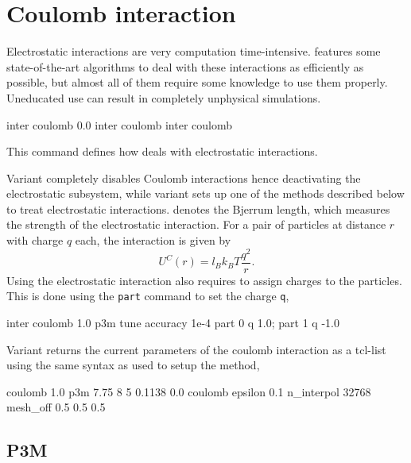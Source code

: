 \section{Coulomb interaction}
\label{sec:inter-electrostatics}

Electrostatic interactions are very computation time-intensive. \es{} features
some state-of-the-art algorithms to deal with these interactions as efficiently
as possible, but almost all of them require some knowledge to use them properly.
Uneducated use can result in completely unphysical simulations.

\begin{essyntax}
   inter coulomb 0.0
   inter coulomb  
   inter coulomb
\end{essyntax}

This command defines how \es deals with electrostatic interactions.

Variant  completely disables Coulomb interactions hence
deactivating the electrostatic subsystem, while variant 
sets up one of the methods described below to treat electrostatic
interactions.  denotes the Bjerrum length, which measures the
strength of the electrostatic interaction.  For a pair of particles at
distance $r$ with charge $q$ each, the interaction is given by
\begin{equation}
  U^C(r)=l_B k_B T\frac{q^2}{r}.
\end{equation}
Using the electrostatic interaction also requires to assign charges to the
particles. This is done using the \texttt{part} command to set the charge
\texttt{q}, \eg

\begin{tclcode}
  inter coulomb 1.0 p3m tune accuracy 1e-4
  part 0 q 1.0; part 1 q -1.0
\end{tclcode}

Variant  returns the current parameters of the coulomb
interaction as a tcl-list using the same syntax as used to setup the
method, \eg
\begin{tclcode}
  {coulomb 1.0 p3m 7.75 8 5 0.1138 0.0}
  {coulomb epsilon 0.1 n_interpol 32768 mesh_off 0.5 0.5 0.5}
\end{tclcode}

\subsection{P3M}


